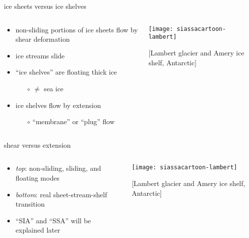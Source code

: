 \documentclass{beamer}
\begin{document}
\begin{frame}{ice sheets versus ice shelves}

\begin{columns}
\begin{column}{0.35\textwidth}
\small
\begin{itemize}
\small
\item non-sliding portions of ice sheets flow by shear deformation
\item ice streams slide
\item ``ice shelves'' are floating thick ice
  \begin{itemize}
  \scriptsize
  \item[$\circ$] $\ne$ sea ice
  \end{itemize}
\item ice shelves flow by extension
  \begin{itemize}
  \scriptsize
  \item[$\circ$] ``membrane'' or ``plug'' flow
  \end{itemize}
\end{itemize}
\end{column}

\begin{column}{0.65\textwidth}
\texttt{[image: siassacartoon-lambert]}

\begin{center}
\vspace{-0.18in}
\tiny [Lambert glacier and Amery ice shelf, Antarctic]
\end{center}
\end{column}
\end{columns}
\end{frame}


\begin{frame}{shear versus extension}

\begin{columns}
\begin{column}{0.35\textwidth}
\small
\begin{itemize}
\item \emph{top}:  non-sliding, sliding, and floating modes
\item \emph{bottom}:  real sheet-stream-shelf transition
\item ``SIA'' and ``SSA'' will be explained later
\end{itemize}
\end{column}

\begin{column}{0.65\textwidth}
\texttt{[image: siassacartoon-lambert]}

\begin{center}
\vspace{-0.18in}
\tiny [Lambert glacier and Amery ice shelf, Antarctic]
\end{center}
\end{column}
\end{columns}
\end{frame}
\end{document}
